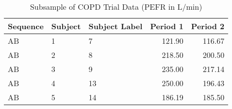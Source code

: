 \begin{table}

\caption{\label{tab:pefrDataSubsample}Subsample of COPD Trial Data (PEFR in L/min)}
\centering
\begin{tabular}[t]{lllrr}
\toprule
Sequence & Subject & Subject Label & Period 1 & Period 2\\
\midrule
AB & 1 & 7 & 121.90 & 116.67\\
AB & 2 & 8 & 218.50 & 200.50\\
AB & 3 & 9 & 235.00 & 217.14\\
AB & 4 & 13 & 250.00 & 196.43\\
AB & 5 & 14 & 186.19 & 185.50\\
\bottomrule
\end{tabular}
\end{table}
